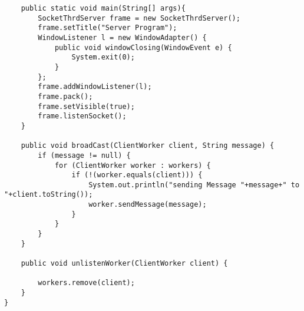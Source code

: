 \documentclass[10pt,a4paper]{article}
\begin{document}
\begin{verbatim}
    public static void main(String[] args){
        SocketThrdServer frame = new SocketThrdServer();
        frame.setTitle("Server Program");
        WindowListener l = new WindowAdapter() {
            public void windowClosing(WindowEvent e) {
                System.exit(0);
            }
        };
        frame.addWindowListener(l);
        frame.pack();
        frame.setVisible(true);
        frame.listenSocket();
    }

    public void broadCast(ClientWorker client, String message) {
        if (message != null) {
            for (ClientWorker worker : workers) {
                if (!(worker.equals(client))) {
                    System.out.println("sending Message "+message+" to "+client.toString());
                    worker.sendMessage(message);
                }
            }
        }
    }

    public void unlistenWorker(ClientWorker client) {

        workers.remove(client);
    }
}
\end{verbatim}

\newpage
\end{document}
